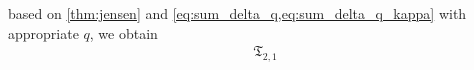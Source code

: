 \documentclass[aos]{imsart}
\begin{document}
\begin{appendix}
based on \cref{thm:jensen} and \cref{eq:sum_delta_q,eq:sum_delta_q_kappa} with appropriate $q$, we obtain
\begin{equation*}
\begin{aligned}
    & \mathfrak{T}_{2,1} \\

\end{aligned}
\end{equation*}
\end{appendix}
\end{document}
